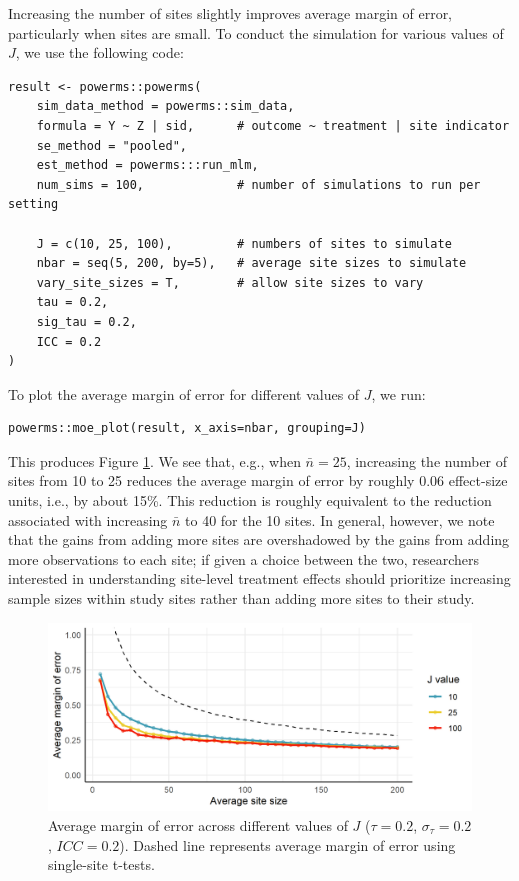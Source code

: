 \documentclass[]{article}
\begin{document}
Increasing the number of sites slightly improves average margin of error, particularly when sites are small.
To conduct the simulation for various values of $J$, we use the following code:
\begin{verbatim}
result <- powerms::powerms(
    sim_data_method = powerms::sim_data,
    formula = Y ~ Z | sid,      # outcome ~ treatment | site indicator
    se_method = "pooled",
    est_method = powerms:::run_mlm,
    num_sims = 100,             # number of simulations to run per setting

    J = c(10, 25, 100),         # numbers of sites to simulate
    nbar = seq(5, 200, by=5),   # average site sizes to simulate
    vary_site_sizes = T,        # allow site sizes to vary
    tau = 0.2,
    sig_tau = 0.2,
    ICC = 0.2
)
\end{verbatim}
To plot the average margin of error for different values of $J$, we run:
\begin{verbatim}
powerms::moe_plot(result, x_axis=nbar, grouping=J)
\end{verbatim}
This produces Figure \ref{fig:results_J}.
We see that, e.g., when $\bar{n}=25$, increasing the number of sites from 10 to 25 reduces the average margin of error by roughly 0.06 effect-size units, i.e., by about 15\%.
This reduction is roughly equivalent to the reduction associated with increasing $\bar{n}$ to 40 for the 10 sites.
In general, however, we note that the gains from adding more sites are overshadowed by the gains from adding more observations to each site;
if given a choice between the two, researchers interested in understanding site-level treatment effects should prioritize increasing sample sizes within study sites rather than adding more sites to their study.
\begin{figure}[t]
	\centering
	\includegraphics[width=\textwidth]{simstudy_J_length}
	\caption{Average margin of error across different values of $J$ ($\tau=0.2$, $\sigma_\tau=0.2$, $ICC=0.2$).
	    Dashed line represents average margin of error using single-site t-tests.}
	\label{fig:results_J}
\end{figure}
\end{document}
